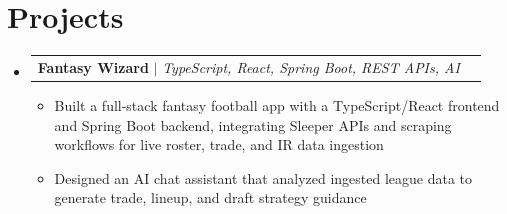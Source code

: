 \documentclass[letterpaper,11pt]{article}
\makeatletter
\newcommand{\resumeItem}[1]{
  \item\small{
    {#1 \vspace{-1pt}}
  }
}
\newcommand{\resumeProjectHeading}[2]{
    \item
    \begin{tabular*}{0.97\textwidth}{l@{\extracolsep{\fill}}r}
      \small#1 & #2 \\
    \end{tabular*}\vspace{-7pt}
}
\newcommand{\resumeSubHeadingListStart}{\begin{itemize}[leftmargin=0.15in, label={}]}
\newcommand{\resumeSubHeadingListEnd}{\end{itemize}}
\newcommand{\resumeItemListStart}{\begin{itemize}[leftmargin=0.18in,itemsep=1pt,topsep=2pt]}
\newcommand{\resumeItemListEnd}{\end{itemize}\vspace{-5pt}}
\makeatother
\begin{document}
%
\section{Projects}
    \resumeSubHeadingListStart
      \resumeProjectHeading
          {\textbf{Fantasy Wizard} $|$ \emph{TypeScript, React, Spring Boot, REST APIs, AI}}{}
          \resumeItemListStart
            \resumeItem{Built a full-stack fantasy football app with a TypeScript/React frontend and Spring Boot backend, integrating Sleeper APIs and scraping workflows for live roster, trade, and IR data ingestion}
            \resumeItem{Designed an AI chat assistant that analyzed ingested league data to generate trade, lineup, and draft strategy guidance}
          \resumeItemListEnd
    \resumeSubHeadingListEnd

\end{document}
